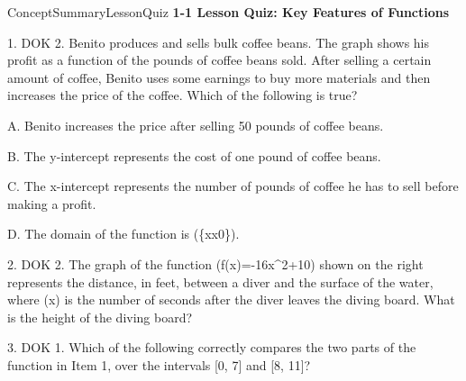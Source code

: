 \documentclass{article}
\newenvironment{te-addendum}[2]{}{}     %
\newcommand{\answer}[1]{}               %
\newcommand{\placeholder}[2]{}          %
\begin{document}
\begin{te-addendum}{ConceptSummary}{LessonQuiz}
\textbf{1-1 Lesson Quiz: Key Features of Functions}

1. DOK 2. Benito produces and sells bulk coffee beans. The graph shows his profit as a function of the pounds of coffee beans sold. After selling a certain amount of coffee, Benito uses some earnings to buy more materials and then increases the price of the coffee. Which of the following is true?

\placeholder{graph}{Quiz item 1 coffee graph: horizontal axis Pounds of coffee sold, labeled 0, 2, 4, 6, 8, 10; vertical axis Profit (dollars), labeled -20, 0, 20, 40, 60, 80. Black connected segments with solid points at integer inputs: first segment from (0,-20) through (1,-10), (2,0), (3,10), (4,20), (5,30), (6,40), (7,50); drop to (8,25); rise through (9,40), (10,55), (11,70). Visible grid approximately x=-1 to 12 and y=-40 to 90. x-intercept 2; y-intercept -20.}

A. Benito increases the price after selling 50 pounds of coffee beans.

B. The y-intercept represents the cost of one pound of coffee beans.

C. The x-intercept represents the number of pounds of coffee he has to sell before making a profit.

D. The domain of the function is (\{x\mid x0\}).
\answer{1. C. The x-intercept represents the number of pounds of coffee he has to sell before making a profit.}

2. DOK 2. The graph of the function (f(x)=-16x^2+10) shown on the right represents the distance, in feet, between a diver and the surface of the water, where (x) is the number of seconds after the diver leaves the diving board. What is the height of the diving board?

\answer{2. 10 feet.}

3. DOK 1. Which of the following correctly compares the two parts of the function in Item 1, over the intervals [0, 7] and [8, 11]?


\end{te-addendum}
\end{document}
